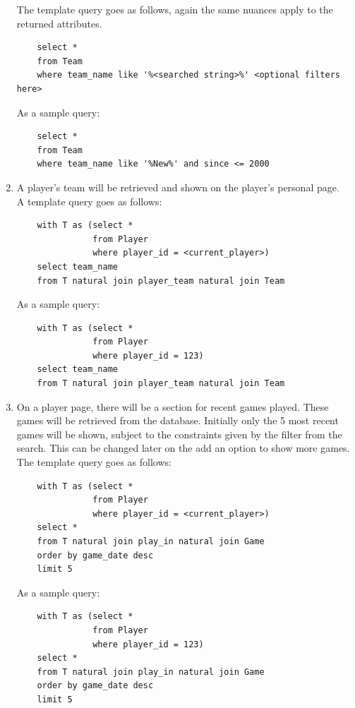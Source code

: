 \documentclass[11pt]{article}
\begin{document}
\begin{enumerate}
The template query goes as follows, again the same nuances apply to the returned attributes.
\begin{verbatim}
    select *
    from Team
    where team_name like '%<searched string>%' <optional filters here>
\end{verbatim}

As a sample query:
\begin{verbatim}
    select *
    from Team
    where team_name like '%New%' and since <= 2000
\end{verbatim}

\item A player's team will be retrieved and shown on the player's personal page.\\ 

A template query goes as follows:
\begin{verbatim}
    with T as (select *
               from Player
               where player_id = <current_player>)
    select team_name
    from T natural join player_team natural join Team
\end{verbatim}

As a sample query:
\begin{verbatim}
    with T as (select *
               from Player
               where player_id = 123)
    select team_name
    from T natural join player_team natural join Team
\end{verbatim}

\item On a player page, there will be a section for recent games played. These games will be retrieved from the database. Initially only the 5 most recent games will be shown, subject to the constraints given by the filter from the search. This can be changed later on the add an option to show more games. \\

The template query goes as follows:

\begin{verbatim}
    with T as (select *
               from Player
               where player_id = <current_player>)
    select *
    from T natural join play_in natural join Game
    order by game_date desc
    limit 5
\end{verbatim}

As a sample query:

\begin{verbatim}
    with T as (select *
               from Player
               where player_id = 123)
    select *
    from T natural join play_in natural join Game
    order by game_date desc
    limit 5
\end{verbatim}


\end{enumerate}
\end{document}
